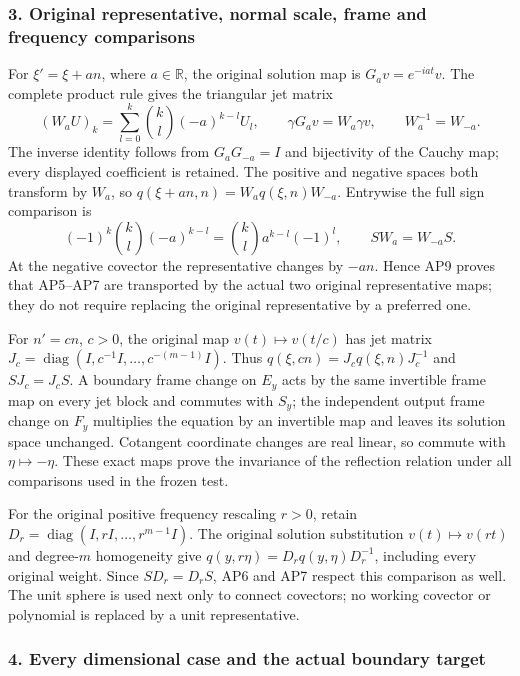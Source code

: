 \documentclass[
  11pt,
]{article}
\begin{document}
\subsubsection{3. Original representative, normal scale, frame and
frequency
comparisons}\label{original-representative-normal-scale-frame-and-frequency-comparisons}

For \(\xi'=\xi+a n\), where \(a\in\mathbb R\), the original solution map
is \(G_av=e^{-iat}v\). The complete product rule gives the triangular
jet matrix \[
 (W_aU)_k=\sum_{l=0}^k\binom{k}{l}(-a)^{k-l}U_l,
 \qquad \gamma G_av=W_a\gamma v,\qquad W_a^{-1}=W_{-a}.
 \tag{AP8}
\] The inverse identity follows from \(G_aG_{-a}=I\) and bijectivity of
the Cauchy map; every displayed coefficient is retained. The positive
and negative spaces both transform by \(W_a\), so
\(q(\xi+a n,n)=W_aq(\xi,n)W_{-a}\). Entrywise the full sign comparison
is \[
 (-1)^k\binom{k}{l}(-a)^{k-l}
     =\binom{k}{l}a^{k-l}(-1)^l,
 \qquad S W_a=W_{-a}S.
 \tag{AP9}
\] At the negative covector the representative changes by \(-a n\).
Hence AP9 proves that AP5--AP7 are transported by the actual two
original representative maps; they do not require replacing the original
representative by a preferred one.

For \(n'=c n\), \(c>0\), the original map \(v(t)\mapsto v(t/c)\) has jet
matrix \(J_c=\operatorname{diag}(I,c^{-1}I,\ldots,c^{-(m-1)}I)\). Thus
\(q(\xi,c n)=J_cq(\xi,n)J_c^{-1}\) and \(S J_c=J_c S\). A boundary frame
change on \(E_y\) acts by the same invertible frame map on every jet
block and commutes with \(S_y\); the independent output frame change on
\(F_y\) multiplies the equation by an invertible map and leaves its
solution space unchanged. Cotangent coordinate changes are real linear,
so commute with \(\eta\mapsto-\eta\). These exact maps prove the
invariance of the reflection relation under all comparisons used in the
frozen test.

For the original positive frequency rescaling \(r>0\), retain
\(D_r=\operatorname{diag}(I,rI,\ldots,r^{m-1}I)\). The original solution
substitution \(v(t)\mapsto v(rt)\) and degree-\(m\) homogeneity give
\(q(y,r\eta)=D_rq(y,\eta)D_r^{-1}\), including every original weight.
Since \(S D_r=D_r S\), AP6 and AP7 respect this comparison as well. The
unit sphere is used next only to connect covectors; no working covector
or polynomial is replaced by a unit representative.

\subsubsection{4. Every dimensional case and the actual boundary
target}\label{every-dimensional-case-and-the-actual-boundary-target}
\end{document}
